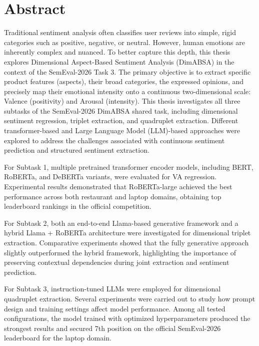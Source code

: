 \documentclass{article}
\begin{document}
\hypersetup{pageanchor=false} 

\clearpage
\hypersetup{pageanchor=true} 

\section*{Abstract}

\large

Traditional sentiment analysis often classifies user reviews into simple, rigid categories such as positive, negative, or neutral. However, human emotions are inherently complex and nuanced. To better capture this depth, this thesis explores Dimensional Aspect-Based Sentiment Analysis (DimABSA) in the context of the SemEval-2026 Task 3. The primary objective is to extract specific product features (aspects), their broad categories, the expressed opinions, and precisely map their emotional intensity onto a continuous two-dimensional scale: Valence (positivity) and Arousal (intensity).
This thesis investigates all three subtasks of the SemEval-2026 DimABSA shared task, including dimensional sentiment regression, triplet extraction, and quadruplet extraction. Different transformer-based and Large Language Model (LLM)-based approaches were explored to address the challenges associated with continuous sentiment prediction and structured sentiment extraction.

For Subtask 1, multiple pretrained transformer encoder models, including BERT, RoBERTa, and DeBERTa variants, were evaluated for VA regression. Experimental results demonstrated that RoBERTa-large achieved the best performance across both restaurant and laptop domains, obtaining top leaderboard rankings in the official competition.

For Subtask 2, both an end-to-end Llama-based generative framework and a hybrid Llama + RoBERTa architecture were investigated for dimensional triplet extraction. Comparative experiments showed that the fully generative approach slightly outperformed the hybrid framework, highlighting the importance of preserving contextual dependencies during joint extraction and sentiment prediction.

For Subtask 3, instruction-tuned LLMs were employed for dimensional quadruplet extraction. Several experiments were carried out to study how prompt design and training settings affect model performance. Among all tested configurations, the model trained with optimized hyperparameters produced the strongest results and secured 7th position on the official SemEval-2026 leaderboard for the laptop domain.
\end{document}
